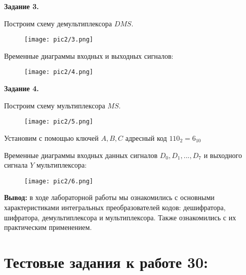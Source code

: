 \documentclass[spec, och, labwork]{shiza}
\begin{document}
\textbf{Задание 3.}

Построим схему демультиплексора $DMS$.

\begin{figure}[H]
    \centering
    \texttt{[image: pic2/3.png]}
    \caption{}
\end{figure}

Временные диаграммы входных и выходных сигналов:

\begin{figure}[H]
    \centering
    \texttt{[image: pic2/4.png]}
    \caption{}
\end{figure}

\textbf{Задание 4.}

Построим схему мультиплексора $MS$.

\begin{figure}[H]
    \centering
    \texttt{[image: pic2/5.png]}
    \caption{}
\end{figure}

Установим с помощью ключей $A,B,C$ адресный код $110_2 = 6_10$

Временные диаграммы входных данных сигналов $D_0,D_1,...,D_7$ и выходного
сигнала $Y$ мультиплексора:

\begin{figure}[H]
    \centering
    \texttt{[image: pic2/6.png]}
    \caption{}
\end{figure}


\textbf{Вывод:} в ходе лабораторной работы мы ознакомились с основными характеристиками
интегральных преобразователей кодов: дешифратора, шифратора, демультиплексора и 
мультиплексора. Также ознакомились с их практическим применением.


\section{Тестовые задания к работе 30:}
\end{document}
